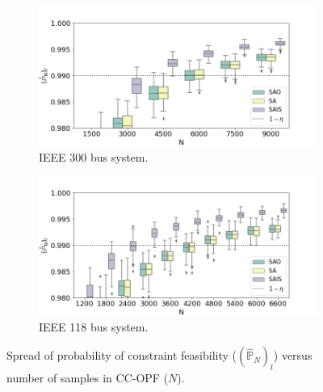 \begin{figure}[hbt]
\centering
\begin{subfigure}{.8\textwidth}
  \centering
  \includegraphics[width=0.99\linewidth]{Dissertation/images/dc_stochastic_approx/case300/boxplot_J_N_9000_eta_001.png}
  \caption{IEEE 300 bus system.}
  \label{fig:ieee300conservatism}
\end{subfigure}

\begin{subfigure}{.8\textwidth}
  \centering
  \includegraphics[width=0.99\linewidth]{Dissertation/images/dc_stochastic_approx/ieee118/boxplot_J_N_6600_eta_001.png}
  \caption{IEEE 118 bus system.}
  \label{fig:ieee118conservatism}
\end{subfigure}
\caption{Spread of probability of constraint feasibility ($(\hat{\mathbb{P}}_N)_l$) versus number of samples in CC-OPF ($N$).}
\label{fig:spreads}
\end{figure}

